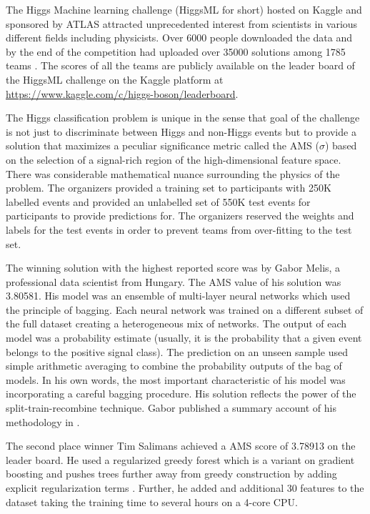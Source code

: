 The Higgs Machine learning challenge (HiggsML for short) hosted on Kaggle and sponsored by ATLAS attracted unprecedented interest from scientists in various different fields including physicists. Over 6000 people downloaded the data and by the end of the competition had uploaded over 35000 solutions among 1785 teams \cite{postRM}. The scores of all the teams are publicly available on the leader board of the HiggsML challenge on the Kaggle platform at \url{https://www.kaggle.com/c/higgs-boson/leaderboard}.

The Higgs classification problem is unique in the sense that goal of the challenge is not just to discriminate between Higgs and non-Higgs events but to provide a solution that maximizes a peculiar significance metric called the AMS ($\sigma$) based on the selection of a signal-rich region of the high-dimensional feature space. There was considerable mathematical nuance surrounding the physics of the problem. The organizers provided a training set to participants with 250K labelled events and provided an unlabelled set of 550K test events for participants to provide predictions for. The organizers reserved the weights and labels for the test events in order to prevent teams from over-fitting to the test set.  

The winning solution with the highest reported score was by Gabor Melis, a professional data scientist from Hungary. The AMS value of his solution was 3.80581. His model was an ensemble of multi-layer neural networks which used the principle of bagging. Each neural network was trained on a different subset of the full dataset creating a heterogeneous mix of networks. The output of each model was a probability estimate (usually, it is the probability that a given event belongs to the positive signal class). The prediction on an unseen sample used simple arithmetic averaging to combine the probability outputs of the bag of  models. In his own words, the most important characteristic of his model was incorporating a careful bagging procedure. His solution reflects the power of the split-train-recombine technique. Gabor published a summary account of his methodology in \cite{melis}. 

The second place winner Tim Salimans achieved a AMS score of 3.78913 on the leader board. He used a regularized greedy forest which is a variant on gradient boosting and pushes trees further away from greedy construction by adding explicit regularization terms \cite{rgf}. Further, he added and additional 30 features to the dataset taking the training time to several hours on a 4-core CPU.

